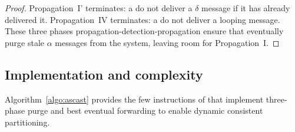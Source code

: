 \begin{proof}
  Propagation~I' terminates: a \process do not deliver a $\delta$
  message if it has already delivered it. Propagation~IV terminates: a
  \process do not deliver a looping message.
  These three phases propagation-detection-propagation ensure that
  \processes eventually purge stale $\alpha$ messages from the system,
  leaving room for Propagation~I.
\end{proof}






\subsection{Implementation and complexity}

Algorithm~\ref{algo:ascast} provides the few instructions of \NAME
that implement three-phase purge and best eventual forwarding to
enable dynamic consistent partitioning.



